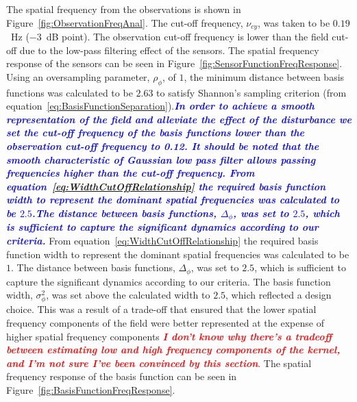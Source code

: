 \documentclass[10pt,a4paper]{article}
\newcommand{\parham}[1]{\textsf{\emph{\textbf{\textcolor{blue}{#1}}}}}
\newcommand{\mike}[1]{\textsf{\emph{\textbf{\textcolor{red}{#1}}}}}
\begin{document}
The spatial frequency from the observations is shown in Figure~\ref{fig:ObservationFreqAnal}. The cut-off frequency, $\nu_{cy}$, was taken to be $0.19$~Hz ($-3$~dB point). The observation cut-off frequency is lower than the field cut-off due to the low-pass filtering effect of the sensors. The spatial frequency response of the sensors can be seen in Figure~\ref{fig:SensorFunctionFreqResponse}. Using an oversampling parameter, $\rho_{\phi}$, of $1$, the minimum distance between basis functions was calculated to be $2.63$ to satisfy Shannon's sampling criterion (from equation~\ref{eq:BasisFunctionSeparation}).\parham{In order to achieve a smooth representation of the field and alleviate the effect of the disturbance we set the cut-off frequency of the basis functions lower than the observation cut-off frequency to 0.12. It should be noted that the smooth characteristic of Gaussian low pass filter allows  passing frequencies higher than the cut-off frequency.  From equation~\ref{eq:WidthCutOffRelationship} the required basis function width to represent the dominant spatial frequencies was calculated to be $2.5$.The distance between basis functions, $\Delta_{\phi}$, was set to $2.5$, which is sufficient to capture the significant dynamics according to our criteria.} From equation~\ref{eq:WidthCutOffRelationship} the required basis function width to represent the dominant spatial frequencies was calculated to be $1$. The distance between basis functions, $\Delta_{\phi}$, was set to $2.5$, which is sufficient to capture the significant dynamics according to our criteria. The basis function width, $\sigma_{\phi}^2$, was set above the calculated width to $2.5$, which reflected a design choice. This was a result of a trade-off that ensured that the lower spatial frequency components of the field were better represented at the expense of higher spatial frequency components \mike{I don't know why there's a tradeoff between estimating low and high frequency components of the kernel, and I'm not sure I've been convinced by this section}. The spatial frequency response of the basis function can be seen in Figure~\ref{fig:BasisFunctionFreqResponse}.
\end{document}
